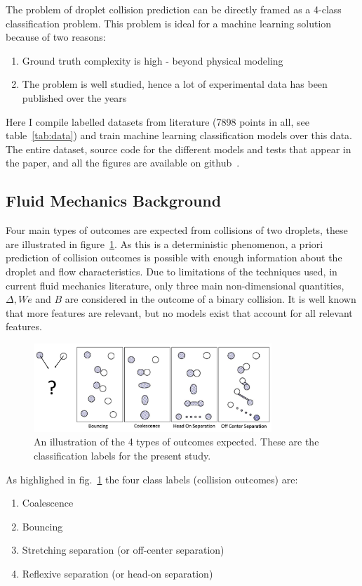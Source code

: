 \documentclass{article}
\begin{document}
The problem of droplet collision prediction can be directly framed as a 4-class classification problem. This problem is ideal for a machine learning solution because of two reasons:
\begin{enumerate}
\item Ground truth complexity is high - beyond physical modeling
\item The problem is well studied, hence a lot of experimental data has been published over the years
\end{enumerate}
Here I compile labelled datasets from literature (7898 points in all, see table~\ref{tab:data}) and train machine learning classification models over this data. The entire dataset, source code for the different models and tests that appear in the paper, and all the figures are available on github~\cite{githubrepo}.



\subsection{Fluid Mechanics Background}
\label{sec:background}
Four main types of outcomes are expected from collisions of two droplets, these are illustrated in figure~\ref{fig:outcomes}. As this is a deterministic phenomenon, a priori prediction of collision outcomes is possible with enough information about the droplet and flow characteristics. Due to limitations of the techniques used, in current fluid mechanics literature, only three main non-dimensional quantities, $\Delta, We$ and $B$ are considered in the outcome of a binary collision. It is well known that more features are relevant, but no models exist that account for all relevant features.

\begin{figure}[h]
	\centering
	\includegraphics[width=0.8\textwidth]{../figures/outcome-illustration.png}
	\caption{An illustration of the 4 types of outcomes expected. These are the classification labels for the present study.}
	\label{fig:outcomes}
\end{figure}
As highlighed in fig.~\ref{fig:outcomes} the four class labels (collision outcomes) are:
\begin{enumerate}
\item Coalescence
\item Bouncing
\item Stretching separation (or off-center separation)
\item Reflexive separation (or head-on separation)
\end{enumerate}
\end{document}
